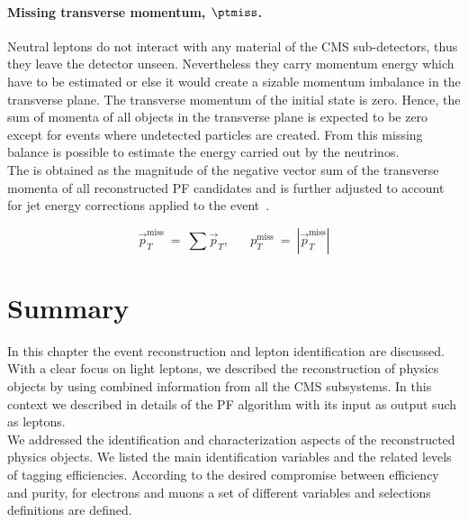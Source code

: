 \paragraph{Missing transverse momentum,
  $\boldsymbol{\ptmiss}$.}\label{sec:c2ptmiss}
Neutral leptons do not interact with any material of the CMS
sub-detectors, thus they leave the detector unseen. Nevertheless they
carry momentum energy which have to be estimated or else it would
create a sizable momentum imbalance in the transverse plane. The
transverse momentum of the initial state is zero. Hence, the sum of 
momenta of all objects in the transverse plane is
expected to be zero except for events where undetected particles are
created. From this missing balance is possible to estimate the energy
carried out by the neutrinos. \\
The \ptmiss is obtained as the magnitude of the negative vector sum of the transverse momenta of 
all reconstructed PF candidates and is further adjusted to account for
jet energy corrections applied to the event~\cite{CMS-PAS-JME-16-004}.
\begin{linenomath}
  \begin{equation}
    \label{eq:c2ptmiss}
    \overrightarrow{p}_T^{\text{miss}} \: = \: \sum \overrightarrow{p}_T,
    \;\;\; \;\;\; p_T^{\text{miss}} \: = \: |\overrightarrow{p}_T^{\text{miss}}|
  \end{equation}
\end{linenomath}

\clearpage
\section{Summary}\label{sec:summaryC3}

In this chapter the event reconstruction and lepton identification are discussed.\\
With a clear focus on light leptons, we described the reconstruction
of physics objects by using combined information from all the CMS
subsystems. In this context we
described in details of the PF algorithm with its input as output such as
leptons. \\
We addressed the identification and characterization aspects of the
reconstructed physics objects. We listed the main identification
variables and the related levels of tagging efficiencies.
According to the desired compromise between efficiency and purity, 
for electrons and muons a set of different variables and selections definitions
are defined.


